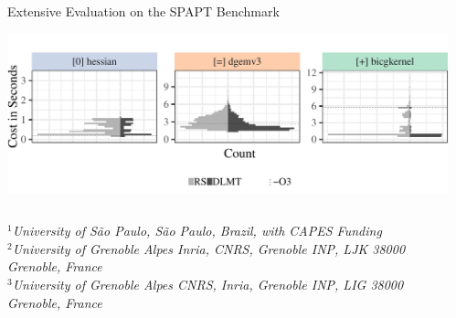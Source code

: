 \documentclass[11pt, compress, aspectratio=169, xcolor={table,usenames,dvipsnames}]{beamer}
\begin{document}
\begin{frame}
\begin{columns}
\begin{column}{0.89\columnwidth}
\begin{columns}
\begin{column}[t]{0.48\columnwidth}
\begin{block}{Extensive Evaluation on the SPAPT Benchmark}
\begin{center}
\begin{center}
\includegraphics[width=0.85\columnwidth]{../../../img/split_histograms.pdf}
\end{center}
\end{center}
\end{block}
\end{column}
\end{columns}
\begin{flushleft}
  \vspace{2em}
  {\small
    \textit{
      $^{1}$University of São Paulo, São Paulo, Brazil, with CAPES Funding \\
      $^{2}$University of Grenoble Alpes Inria, CNRS, Grenoble INP, LJK 38000 Grenoble, France \\[-0.2em]
      $^{3}$University of Grenoble Alpes CNRS, Inria, Grenoble INP, LIG 38000 Grenoble, France
    }
  }
\end{flushleft}
\end{column}
\begin{column}{0.09\columnwidth}
\end{column}
\end{columns}
\end{frame}
\end{document}
